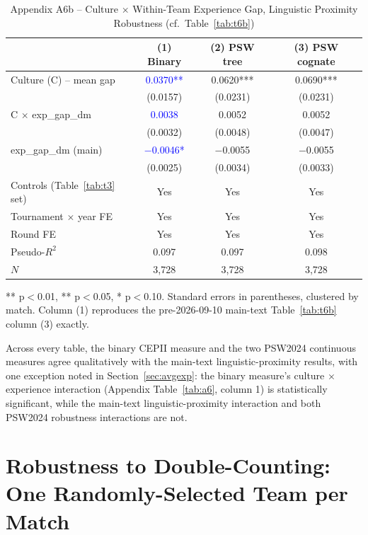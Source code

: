 \documentclass[10pt]{article}
\begin{document}
\begin{table}[htbp]
\centering
\caption{Appendix A6b -- Culture $\times$ Within-Team Experience Gap, Linguistic Proximity Robustness (cf.\ Table~\ref{tab:t6b}) \label{tab:a6b}}
\begin{threeparttable}
\begin{tabular}{lccc}
\toprule
 & (1) Binary & (2) PSW tree & (3) PSW cognate \\
\midrule
Culture (C) -- mean gap & \textcolor{blue}{0.0370**} & 0.0620*** & 0.0690*** \\
 & (0.0157) & (0.0231) & (0.0231) \\
C $\times$ exp\_gap\_dm & \textcolor{blue}{0.0038} & 0.0052 & 0.0052 \\
 & (0.0032) & (0.0048) & (0.0047) \\
exp\_gap\_dm (main) & \textcolor{blue}{$-$0.0046*} & $-$0.0055 & $-$0.0055 \\
 & (0.0025) & (0.0034) & (0.0033) \\
\midrule
Controls (Table~\ref{tab:t3} set) & Yes & Yes & Yes \\
Tournament $\times$ year FE & Yes & Yes & Yes \\
Round FE & Yes & Yes & Yes \\
Pseudo-$R^2$ & 0.097 & 0.097 & 0.098 \\
$N$ & 3,728 & 3,728 & 3,728 \\
\bottomrule
\end{tabular}
\begin{tablenotes}
\small
\item *** p$<$0.01, ** p$<$0.05, * p$<$0.10. Standard errors in parentheses, clustered by match. Column (1) reproduces the pre-2026-09-10 main-text Table~\ref{tab:t6b} column (3) exactly.
\end{tablenotes}
\end{threeparttable}
\end{table}
\FloatBarrier

Across every table, the binary CEPII measure and the two PSW2024 continuous measures agree qualitatively with the main-text linguistic-proximity results, with one exception noted in Section~\ref{sec:avgexp}: the binary measure's culture $\times$ experience interaction (Appendix Table~\ref{tab:a6}, column 1) is statistically significant, while the main-text linguistic-proximity interaction and both PSW2024 robustness interactions are not.

\section{Robustness to Double-Counting: One Randomly-Selected Team per Match}
\label{app:randone}
\end{document}
